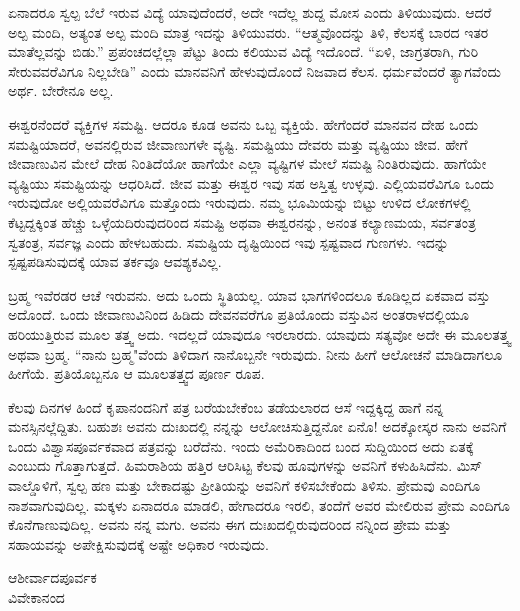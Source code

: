 \newpage

ಏನಾದರೂ ಸ್ವಲ್ಪ ಬೆಲೆ ಇರುವ ವಿದ್ಯೆ ಯಾವುದೆಂದರೆ, ಅದೇ ಇದೆಲ್ಲ ಶುದ್ದ ಮೋಸ ಎಂದು ತಿಳಿಯುವುದು. ಆದರೆ ಅಲ್ಪ ಮಂದಿ, ಅತ್ಯಂತ ಅಲ್ಪ ಮಂದಿ ಮಾತ್ರ ಇದನ್ನು ತಿಳಿಯುವರು. ``ಆತ್ಮವೊಂದನ್ನು ತಿಳಿ, ಕೆಲಸಕ್ಕೆ ಬಾರದ ಇತರ ಮಾತೆಲ್ಲವನ್ನು ಬಿಡು.” ಪ್ರಪಂಚದಲ್ಲೆಲ್ಲಾ ಪೆಟ್ಟು ತಿಂದು ಕಲಿಯುವ ವಿದ್ಯೆ ಇದೊಂದೆ. ``ಏಳಿ, ಜಾಗ್ರತರಾಗಿ, ಗುರಿ ಸೇರುವವರೆವಿಗೂ ನಿಲ್ಲಬೇಡಿ” ಎಂದು ಮಾನವನಿಗೆ ಹೇಳುವುದೊಂದೆ ನಿಜವಾದ ಕೆಲಸ. ಧರ್ಮವೆಂದರೆ ತ್ಯಾಗವೆಂದು ಅರ್ಥ. ಬೇರೇನೂ ಅಲ್ಲ.

\vspace{0.1cm}

ಈಶ್ವರನೆಂದರೆ ವ್ಯಕ್ತಿಗಳ ಸಮಷ್ಟಿ. ಆದರೂ ಕೂಡ ಅವನು ಒಬ್ಬ ವ್ಯಕ್ತಿಯೆ. ಹೇಗೆಂದರೆ ಮಾನವನ ದೇಹ ಒಂದು ಸಮಷ್ಟಿಯಾದರೆ, ಅವನಲ್ಲಿರುವ ಜೀವಾಣುಗಳೇ  ವ್ಯಷ್ಟಿ. ಸಮಷ್ಟಿಯು ದೇವರು ಮತ್ತು ವ್ಯಷ್ಟಿಯು ಜೀವ. ಹೇಗೆ ಜೀವಾಣುವಿನ  ಮೇಲೆ ದೇಹ ನಿಂತಿದೆಯೋ ಹಾಗೆಯೇ ಎಲ್ಲಾ ವ್ಯಷ್ಟಿಗಳ ಮೇಲೆ ಸಮಷ್ಟಿ ನಿಂತಿರುವುದು. ಹಾಗೆಯೇ ವ್ಯಷ್ಟಿಯು ಸಮಷ್ಟಿಯನ್ನು ಆಧರಿಸಿದೆ. ಜೀವ ಮತ್ತು ಈಶ್ವರ ಇವು ಸಹ ಅಸ್ತಿತ್ವ ಉಳ್ಳವು. ಎಲ್ಲಿಯವರೆವಿಗೂ ಒಂದು ಇರುವುದೋ ಅಲ್ಲಿಯವರೆವಿಗೂ ಮತ್ತೊಂದು ಇರುವುದು. ನಮ್ಮ ಭೂಮಿಯನ್ನು ಬಿಟ್ಟು ಉಳಿದ ಲೋಕಗಳಲ್ಲಿ ಕೆಟ್ಟದ್ದಕ್ಕಿಂತ ಹೆಚ್ಚು ಒಳ್ಳೆಯದಿರುವುದರಿಂದ ಸಮಷ್ಟಿ ಅಥವಾ ಈಶ್ವರನನ್ನು, ಅನಂತ ಕಲ್ಯಾಣಮಯ, ಸರ್ವತಂತ್ರ ಸ್ವತಂತ್ರ, ಸರ್ವಜ್ಞ ಎಂದು ಹೇಳಬಹುದು. ಸಮಷ್ಟಿಯ ದೃಷ್ಟಿಯಿಂದ ಇವು ಸ್ಪಷ್ಟವಾದ ಗುಣಗಳು. ಇದನ್ನು ಸ್ಪಷ್ಟಪಡಿಸುವುದಕ್ಕೆ ಯಾವ ತರ್ಕವೂ ಆವಶ್ಯಕವಿಲ್ಲ.

\vspace{0.1cm}

ಬ್ರಹ್ಮ ಇವೆರಡರ ಆಚೆ ಇರುವನು. ಅದು ಒಂದು ಸ್ಥಿತಿಯಲ್ಲ. ಯಾವ ಭಾಗಗಳಿಂದಲೂ ಕೂಡಿಲ್ಲದ ಏಕವಾದ ವಸ್ತು ಅದೊಂದೆ. ಒಂದು ಜೀವಾಣುವಿನಿಂದ ಹಿಡಿದು ದೇವನವರೆಗೂ ಪ್ರತಿಯೊಂದು ವಸ್ತುವಿನ ಅಂತರಾಳದಲ್ಲಿಯೂ ಹರಿಯುತ್ತಿರುವ ಮೂಲ ತತ್ತ್ವ ಅದು. ಇದಲ್ಲದೆ ಯಾವುದೂ ಇರಲಾರದು. ಯಾವುದು ಸತ್ಯವೋ ಅದೇ ಈ ಮೂಲತತ್ತ್ವ ಅಥವಾ ಬ್ರಹ್ಮ. ``ನಾನು ಬ್ರಹ್ಮ"ವೆಂದು ತಿಳಿದಾಗ ನಾನೊಬ್ಬನೇ ಇರುವುದು. ನೀನು ಹೀಗೆ ಆಲೋಚನೆ ಮಾಡಿದಾಗಲೂ ಹೀಗೆಯೆ. ಪ್ರತಿಯೊಬ್ಬನೂ ಆ ಮೂಲತತ್ತ್ವದ ಪೂರ್ಣ ರೂಪ.

\vspace{0.1cm}

ಕೆಲವು ದಿನಗಳ ಹಿಂದೆ ಕೃಪಾನಂದನಿಗೆ ಪತ್ರ ಬರೆಯಬೇಕೆಂಬ ತಡೆಯಲಾರದ ಆಸೆ ಇದ್ದಕ್ಕಿದ್ದ ಹಾಗೆ ನನ್ನ ಮನಸ್ಸಿನಲ್ಲೆದ್ದಿತು. ಬಹುಶಃ ಅವನು ದುಃಖದಲ್ಲಿ ನನ್ನನ್ನು ಆಲೋಚಿಸುತ್ತಿದ್ದನೋ ಏನೊ! ಅದಕ್ಕೋಸ್ಕರ ನಾನು ಅವನಿಗೆ ಒಂದು ವಿಶ್ವಾಸಪೂರ್ವಕವಾದ ಪತ್ರವನ್ನು ಬರೆದೆನು. ಇಂದು ಅಮೆರಿಕಾದಿಂದ ಬಂದ ಸುದ್ದಿಯಿಂದ ಅದು ಏತಕ್ಕೆ ಎಂಬುದು ಗೊತ್ತಾಗುತ್ತದೆ. ಹಿಮರಾಶಿಯ ಹತ್ತಿರ ಆರಿಸಿಟ್ಟ ಕೆಲವು ಹೂವುಗಳನ್ನು ಅವನಿಗೆ ಕಳುಹಿಸಿದೆನು. ಮಿಸ್ ವಾಲ್ಡೊಳಿಗೆ, ಸ್ವಲ್ಪ ಹಣ ಮತ್ತು ಬೇಕಾದಷ್ಟು ಪ್ರೀತಿಯನ್ನು ಅವನಿಗೆ ಕಳಿಸಬೇಕೆಂದು ತಿಳಿಸು. ಪ್ರೇಮವು ಎಂದಿಗೂ ನಾಶವಾಗುವುದಿಲ್ಲ. ಮಕ್ಕಳು ಏನಾದರೂ ಮಾಡಲಿ, ಹೇಗಾದರೂ ಇರಲಿ, ತಂದೆಗೆ ಅವರ ಮೇಲಿರುವ ಪ್ರೇಮ ಎಂದಿಗೂ ಕೊನೆಗಾಣುವುದಿಲ್ಲ. ಅವನು ನನ್ನ ಮಗು. ಅವನು ಈಗ ದುಃಖದಲ್ಲಿರುವುದರಿಂದ ನನ್ನಿಂದ ಪ್ರೇಮ ಮತ್ತು ಸಹಾಯವನ್ನು ಅಪೇಕ್ಷಿಸುವುದಕ್ಕೆ ಅಷ್ಟೇ ಅಧಿಕಾರ ಇರುವುದು.

{\flushright
ಆಶೀರ್ವಾದಪೂರ್ವಕ\\ವಿವೇಕಾನಂದ\par}

